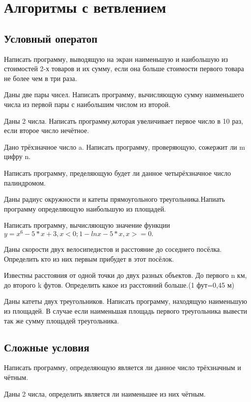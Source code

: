 \section{Алгоритмы с ветвлением}

\subsection{Условный оператоп}

\task Написать программу, выводящую на экран наименьшую и наибольшую из стоимостей 2-х товаров и их сумму, если она больше стоимости первого товара не более чем в три раза.

\task Даны две пары чисел. Написать программу, вычисляющую сумму наименьшего числа из первой пары с наибольшим числом из второй.

\task Даны 2 числа. Написать программу,которая увеличивает первое число в 10 раз, если второе число нечётное.

\task Дано трёхзначное число a. Написать программу, проверяющую, сожержит ли m цифру n.

\task Написать программу, пределяющую будет ли данное четырёхзначное число палиндромом.

\task Даны радиус окружности и катеты прямоугольного треугольника.Напиать программу определяющую наибольшую из площадей.

\task Написать программу, вычисляющую значение функции $y= x^6-5*x+3, x<0;
1-lnx-5*x, x>=0.$

\task Даны скорости двух велосипедистов и расстояние до соседнего посёлка. Определить кто из них первым прибудет в этот посёлок.

\task Известны расстояния от одной точки до двух разных объектов. До первого n км, до второго k футов. Определить какое из расстояний больше.(1 фут=0,45 м)

\task Даны катеты двух треугольников. Написать программу, находящую наименьшую из площадей. В случае если наименьшая площадь первого треугольника вывести так же сумму площадей треугольника.

\subsection{Сложные условия}

\task Написать программу, определяющую является ли данное число трёхзначным и чётным.

\task Даны 2 числа, определить является ли наименьшее из них чётным.


